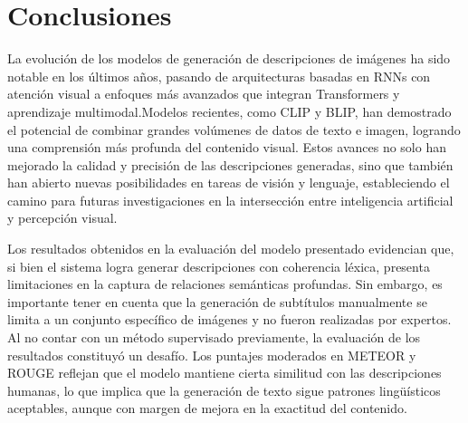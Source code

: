 \chapter{Conclusiones}\label{chapter:conclusions}

La evolución de los modelos de generación de descripciones de imágenes ha sido notable en los últimos años, pasando de arquitecturas basadas en RNNs con atención visual a enfoques más avanzados que integran Transformers y aprendizaje multimodal.Modelos recientes, como CLIP y BLIP, han demostrado el potencial de combinar grandes volúmenes de datos de texto e imagen, logrando una comprensión más profunda del contenido visual. Estos avances no solo han mejorado la calidad y precisión de las descripciones generadas, sino que también han abierto nuevas posibilidades en tareas de visión y lenguaje, estableciendo el camino para futuras investigaciones en la intersección entre inteligencia artificial y percepción visual.

Los resultados obtenidos en la evaluación del modelo presentado evidencian que, si bien el sistema logra generar descripciones con coherencia léxica, presenta limitaciones en la captura de relaciones semánticas profundas.  Sin embargo, es importante tener en cuenta que la generación de subtítulos manualmente se limita a un conjunto específico de imágenes y no fueron realizadas por expertos.
Al no contar con un método supervisado previamente, la evaluación de los resultados constituyó un desafío.
Los puntajes moderados en METEOR y ROUGE reflejan que el modelo mantiene cierta similitud con las descripciones humanas, lo que implica que la generación de texto sigue patrones lingüísticos aceptables, aunque con margen de mejora en la exactitud del contenido.    
